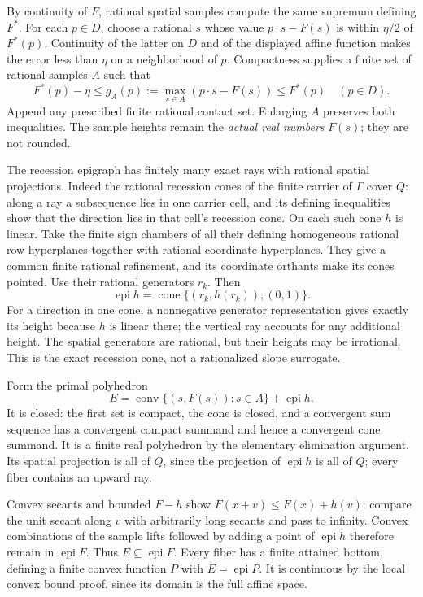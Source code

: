 \documentclass[
  11pt,
]{article}
\begin{document}
By continuity of \(F\), rational spatial samples compute the same
supremum defining \(F^*\). For each \(p\in D\), choose a rational \(s\)
whose value \(p\cdot s-F(s)\) is within \(\eta/2\) of \(F^*(p)\).
Continuity of the latter on \(D\) and of the displayed affine function
makes the error less than \(\eta\) on a neighborhood of \(p\).
Compactness supplies a finite set of rational samples \(A\) such that
\[ F^*(p)-\eta\leq g_A(p):=\max_{s\in A}(p\cdot s-F(s))\leq F^*(p)
\quad(p\in D). \] Append any prescribed finite rational contact set.
Enlarging \(A\) preserves both inequalities. The sample heights remain
the \emph{actual real numbers} \(F(s)\); they are not rounded.

The recession epigraph has finitely many exact rays with rational
spatial projections. Indeed the rational recession cones of the finite
carrier of \(\Gamma\) cover \(Q\): along a ray a subsequence lies in one
carrier cell, and its defining inequalities show that the direction lies
in that cell's recession cone. On each such cone \(h\) is linear. Take
the finite sign chambers of all their defining homogeneous rational row
hyperplanes together with rational coordinate hyperplanes. They give a
common finite rational refinement, and its coordinate orthants make its
cones pointed. Use their rational generators \(r_k\). Then
\[ \operatorname{epi}h=\operatorname{cone}\{(r_k,h(r_k)),(0,1)\}. \] For
a direction in one cone, a nonnegative generator representation gives
exactly its height because \(h\) is linear there; the vertical ray
accounts for any additional height. The spatial generators are rational,
but their heights may be irrational. This is the exact recession cone,
not a rationalized slope surrogate.

Form the primal polyhedron
\[ E=\operatorname{conv}\{(s,F(s)):s\in A\}+\operatorname{epi}h. \] It
is closed: the first set is compact, the cone is closed, and a
convergent sum sequence has a convergent compact summand and hence a
convergent cone summand. It is a finite real polyhedron by the
elementary elimination argument. Its spatial projection is all of \(Q\),
since the projection of \(\operatorname{epi}h\) is all of \(Q\); every
fiber contains an upward ray.

Convex secants and bounded \(F-h\) show \(F(x+v)\leq F(x)+h(v)\):
compare the unit secant along \(v\) with arbitrarily long secants and
pass to infinity. Convex combinations of the sample lifts followed by
adding a point of \(\operatorname{epi}h\) therefore remain in
\(\operatorname{epi}F\). Thus \(E\subseteq\operatorname{epi}F\). Every
fiber has a finite attained bottom, defining a finite convex function
\(P\) with \(E=\operatorname{epi}P\). It is continuous by the local
convex bound proof, since its domain is the full affine space.
\end{document}
